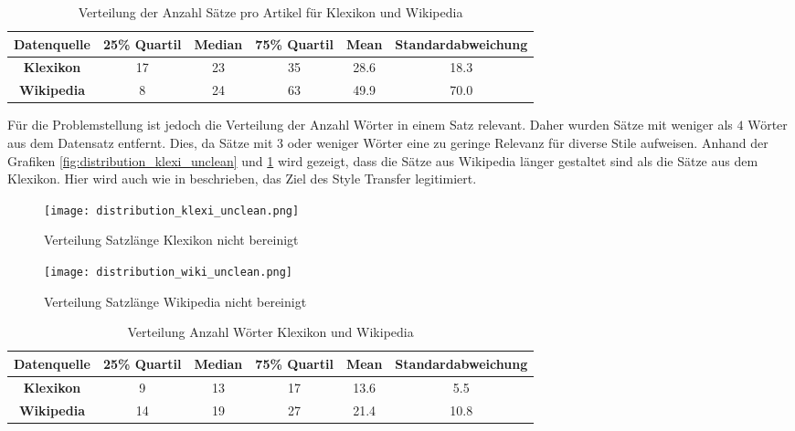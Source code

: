 \begin{table}[H]
  \centering
  \begin{tabular}{|c|c|c|c|c|c|}
      \hline
      \textbf{Datenquelle}& \textbf{25\% Quartil}& \textbf{Median}& \textbf{75\% Quartil} & \textbf{Mean} &
      \textbf{Standardabweichung}\\
      \hline
      \textbf{Klexikon}& 17 & 23 & 35 & 28.6 & 18.3\\
      \hline
      \textbf{Wikipedia}& 8 & 24 & 63 & 49.9 & 70.0\\
      \hline
  \end{tabular}
  \caption{Verteilung der Anzahl Sätze pro Artikel für Klexikon und Wikipedia}
\label{tab:distribution_sentences_per_article}
\end{table}
\noindent
Für die Problemstellung ist jedoch die Verteilung der Anzahl Wörter in einem Satz relevant. Daher wurden Sätze mit
weniger als $ 4 $ Wörter aus dem Datensatz entfernt. Dies, da Sätze mit $ 3 $ oder weniger Wörter eine zu geringe
Relevanz für diverse Stile aufweisen. Anhand der Grafiken \ref{fig:distribution_klexi_unclean} und
\ref{fig:distribution_wiki_unclean} wird gezeigt, dass die Sätze aus Wikipedia länger gestaltet sind als die Sätze aus
dem Klexikon. Hier wird auch wie in  beschrieben, das Ziel des Style
Transfer legitimiert.
\begin{figure}[H]
    \texttt{[image: distribution\_klexi\_unclean.png]}
    \caption{Verteilung Satzlänge Klexikon nicht bereinigt}\label{fig:distribution_klexi_unclean}
  \endminipage\hfill
    \texttt{[image: distribution\_wiki\_unclean.png]}
    \caption{Verteilung Satzlänge Wikipedia nicht bereinigt}\label{fig:distribution_wiki_unclean}
  \endminipage\hfill     
\end{figure}
\begin{table}[H]
  \centering
  \begin{tabular}{|c|c|c|c|c|c|}
    \hline
    \textbf{Datenquelle}& \textbf{25\% Quartil}& \textbf{Median}& \textbf{75\% Quartil} & \textbf{Mean} &
    \textbf{Standardabweichung}\\
    \hline
    \textbf{Klexikon}& 9 & 13 & 17 & 13.6 & 5.5\\
    \hline
    \textbf{Wikipedia}& 14 & 19 & 27 & 21.4 & 10.8\\
    \hline
  \end{tabular}
  \caption{Verteilung Anzahl Wörter Klexikon und Wikipedia}
\label{tab:distribution_klexi_wiki_unclean}
\end{table}
